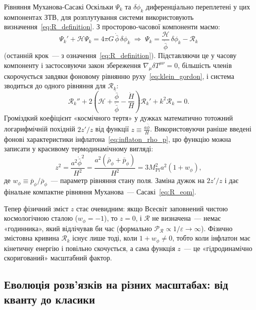 \begin{mathbox}{Рівняння Муханова-Сасакі}
    Оскільки $\Psi_k$ та $\delta\phi_k$ диференціально переплетені у цих компонентах ЗТВ, для розплутування системи
    використовують визначення~\eqref{eq:R_definition}. З просторово-часової компоненти маємо:
    \begin{equation*}
      \Psi_k' + \mathcal{H}\Psi_k = 4\pi G\,\dot{\bar\phi}\,\delta\phi_k
      \;\Longrightarrow\;
      \Psi_k = \frac{\mathcal{H}}{\dot{\bar\phi}}\,\delta\phi_k - \mathcal{R}_k
    \end{equation*}
    (останній крок~--- з означення~\eqref{eq:R_definition}).
    Підставляючи це у часову компоненту і застосовуючи закон збереження
    $\nabla_\mu \delta T^{\mu\nu} = 0$, більшість членів скорочується
    завдяки фоновому рівнянню руху~\eqref{eq:klein_gordon},
    і система зводиться до одного рівняння для $\mathcal{R}_k$:
    \begin{equation*}
      \mathcal{R}_k'' + 2\left(\mathcal{H} + \frac{\ddot{\bar\phi}}{\dot{\bar\phi}} - \frac{\dot{H}}{H}\right)\mathcal{R}_k' + k^2\mathcal{R}_k = 0.
    \end{equation*}
    Громіздкий коефіцієнт «космічного тертя» у дужках математично тотожний логарифмічній похідній $2z'/z$ від функції
    $z \equiv \frac{a\dot{\bar\phi}}{H}$. Використовуючи раніше введені фонові характеристики інфлатона~\eqref{eq:inflaton_rho_p},
    цю функцію можна записати у красивому термодинамічному вигляді:
    \begin{equation*}
       z^2 = \frac{a^2 \dot{\bar{\phi}}^2}{H^2} = \frac{a^2 (\bar{\rho}_\phi + \bar{p}_\phi)}{H^2} = 3 M_{\mathrm{Pl}}^2 a^2 (1 + w_\phi),
    \end{equation*}
    де $w_\phi \equiv \bar{p}_\phi / \bar{\rho}_\phi$~--- параметр рівняння стану поля. Заміна дужок на $2z'/z$ і дає
    фінальне компактне рівняння Муханова~--- Сасакі~\eqref{eq:R_eom}.

    Тепер фізичний зміст $z$ стає очевидним: якщо Всесвіт заповнений чистою космологічною сталою ($w_\phi = -1$), то $z = 0$, і $\mathcal{R}$ не визначена~--- немає «годинника», який відлічував би час (формально $\mathcal{P}_{\mathcal{R}} \propto 1/\varepsilon \to \infty$). Фізично змістовна кривина $\mathcal{R}_k$ існує лише тоді, коли $1 + w_\phi \neq 0$, тобто коли інфлатон має кінетичну енергію і повільно скочується, а сама функція $z$~--- це «гідродинамічно скоригований» масштабний фактор.
\end{mathbox}


\subsection*{Еволюція розв'язків на різних масштабах: від кванту до класики}

